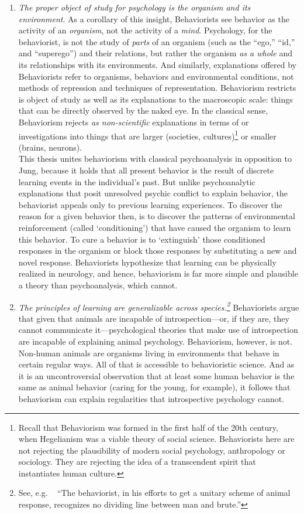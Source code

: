 \begin{refsection}
\begin{enumerate}
\item \emph{The proper object of study for psychology is the organism and its environment}. As a corollary of this insight, Behaviorists see behavior as the activity of an \emph{organism}, not the activity of a \emph{mind}. Psychology, for the behaviorist, is not the study of \emph{parts} of an organism (such as the “ego,” “id,” and “superego”) and their relations, but rather the organism \emph{as a whole} and its relationships with its environments. And similarly, explanations offered by Behaviorists refer to organisms, behaviors and environmental conditions, not methods of repression and techniques of representation. Behaviorism restricts is object of study as well as its explanations to the macroscopic scale: things that can be directly observed by the naked eye. In the classical sense, Behaviorism rejects \emph{as non-scientific} explanations in terms of or investigations into things that are larger (societies, cultures)\footnote{Recall that Behaviorism was formed in the first half of the 20th century, when Hegelianism was a viable theory of social science. Behaviorists here are not rejecting the plausibility of modern social psychology, anthropology or sociology. They are rejecting the idea of a transcendent spirit that instantiates human culture.} or smaller (brains, neurons).\\
This thesis unites behaviorism with classical psychoanalysis in opposition to Jung, because it holds that all present behavior is the result of discrete learning events in the individual's past. But unlike psychoanalytic explanations that posit unresolved psychic conflict to explain behavior, the behaviorist appeals only to previous learning experiences. To discover the reason for a given behavior then, is to discover the patterns of environmental reinforcement (called `conditioning') that have caused the organism to learn this behavior. To cure a behavior is to `extinguish' those conditioned responses in the organism or block those responses by substituting a new and novel response. Behaviorists hypothesize that learning can be physically realized in neurology, and hence, behaviorism is far more simple and plausible a theory than psychoanalysis, which cannot.

\item \emph{The principles of learning are generalizable across species.\footnote{See, e.g. ~\citep{Watson:1913tq} “The behaviorist, in his efforts to get a unitary scheme of animal response, recognizes no dividing line between man and brute.”}} Behaviorists argue that given that animals are incapable of introspection—or, if they are, they cannot communicate it—psychological theories that make use of introspection are incapable of explaining animal psychology. Behaviorism, however, is not. Non-human animals are organisms living in environments that behave in certain regular ways. All of that is accessible to behavioristic science. And as it is an uncontroversial observation that at least some human behavior is the same as animal behavior (caring for the young, for example), it follows that behaviorism can explain regularities that introspective psychology cannot.


\end{enumerate}
\end{refsection}

